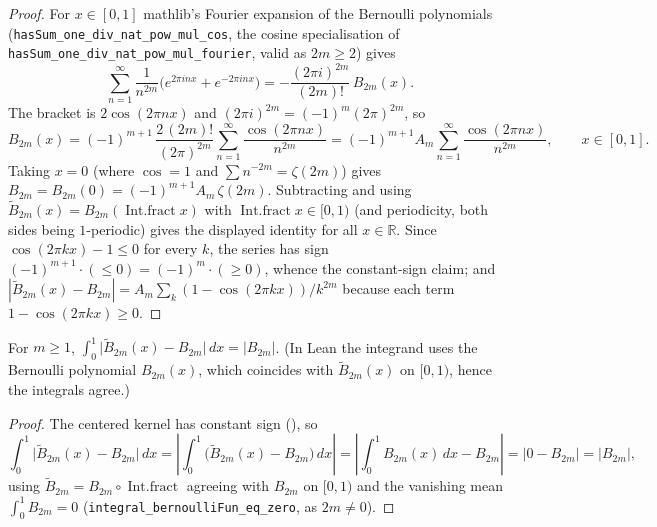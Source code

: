 \begin{proof}
\leanok
{}
For $x \in [0,1]$ mathlib's Fourier expansion of the Bernoulli polynomials
(\texttt{hasSum\_one\_div\_nat\_pow\_mul\_cos}, the cosine specialisation of
\texttt{hasSum\_one\_div\_nat\_pow\_mul\_fourier}, valid as $2m \ge 2$) gives
\[
  \sum_{n=1}^{\infty}\frac{1}{n^{2m}}\bigl(e^{2\pi i n x} + e^{-2\pi i n x}\bigr)
  = -\frac{(2\pi i)^{2m}}{(2m)!}\,B_{2m}(x).
\]
The bracket is $2\cos(2\pi n x)$ and $(2\pi i)^{2m} = (-1)^m (2\pi)^{2m}$, so
\[
  B_{2m}(x) = (-1)^{m+1}\,\frac{2\,(2m)!}{(2\pi)^{2m}}\sum_{n=1}^{\infty}\frac{\cos(2\pi n x)}{n^{2m}}
            = (-1)^{m+1} A_m \sum_{n=1}^{\infty}\frac{\cos(2\pi n x)}{n^{2m}}, \qquad x \in [0,1].
\]
Taking $x = 0$ (where $\cos = 1$ and $\sum n^{-2m} = \zeta(2m)$) gives
$B_{2m} = B_{2m}(0) = (-1)^{m+1} A_m\,\zeta(2m)$. Subtracting and using
$\widetilde{B}_{2m}(x) = B_{2m}(\operatorname{Int.fract} x)$ with $\operatorname{Int.fract} x \in [0,1)$
(and periodicity, both sides being $1$-periodic) gives the displayed identity for all
$x \in \mathbb{R}$. Since $\cos(2\pi k x) - 1 \le 0$ for every $k$, the series has sign
$(-1)^{m+1}\cdot(\le 0) = (-1)^m\cdot(\ge 0)$, whence the constant-sign claim; and
$|\widetilde{B}_{2m}(x) - B_{2m}| = A_m\sum_k (1-\cos(2\pi k x))/k^{2m}$ because each term
$1 - \cos(2\pi k x) \ge 0$.
\end{proof}

\begin{lemma}
\label{lem:bernoulli_centered_mean}
\leanok
{}
For $m \ge 1$, $\displaystyle\int_0^1 \bigl|\widetilde{B}_{2m}(x) - B_{2m}\bigr|\,dx = |B_{2m}|$.
(In Lean the integrand uses the Bernoulli polynomial $B_{2m}(x)$, which coincides with
$\widetilde{B}_{2m}(x)$ on $[0,1)$, hence the integrals agree.)
\end{lemma}

\begin{proof}
\leanok
{}
The centered kernel has constant sign (), so
\[
  \int_0^1 \bigl|\widetilde{B}_{2m}(x) - B_{2m}\bigr|\,dx
  = \left|\int_0^1 \bigl(\widetilde{B}_{2m}(x) - B_{2m}\bigr)\,dx\right|
  = \left|\int_0^1 B_{2m}(x)\,dx - B_{2m}\right| = |0 - B_{2m}| = |B_{2m}|,
\]
using $\widetilde{B}_{2m} = B_{2m}\circ\operatorname{Int.fract}$ agreeing with $B_{2m}$ on $[0,1)$
and the vanishing mean $\int_0^1 B_{2m} = 0$ (\texttt{integral\_bernoulliFun\_eq\_zero}, as
$2m \ne 0$).
\end{proof}

